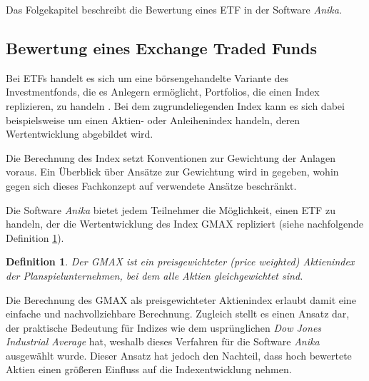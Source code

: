 \documentclass[12pt, a4paper]{article}
\theoremstyle{plain}
\newtheorem{definition}{Definition}
\begin{document}
 
Das Folgekapitel beschreibt die Bewertung eines \gls{ETF} in der Software \textit{Anika}.

\subsection{Bewertung eines Exchange Traded Funds}
\label{sec:bewertung_eines_exchange_traded_funds}

Bei \glspl{ETF} handelt es sich um eine börsengehandelte Variante des Investmentfonds, die es Anlegern ermöglicht, Portfolios, die einen Index replizieren, zu handeln \autocite[][S.~103]{bodie_investments_2018}. Bei dem zugrundeliegenden Index kann es sich dabei beispielsweise um einen Aktien- oder Anleihenindex handeln, deren Wertentwicklung abgebildet wird.

Die Berechnung des Index setzt Konventionen zur Gewichtung der Anlagen voraus. Ein Überblick über Ansätze zur Gewichtung wird in \textcite[][S.~44~ff.]{bodie_investments_2018} gegeben, wohin gegen sich dieses Fachkonzept auf verwendete Ansätze beschränkt.

Die Software \textit{Anika} bietet jedem Teilnehmer die Möglichkeit, einen ETF zu handeln, der die Wertentwicklung des Index \gls{GMAX} repliziert (siehe nachfolgende Definition \ref{def:gmax}).

\begin{definition}
	\label{def:gmax}
	Der \gls{GMAX} ist ein preisgewichteter (\textit{price weighted}) Aktienindex der Planspielunternehmen, bei dem alle Aktien gleichgewichtet sind.
\end{definition}

Die Berechnung des \gls{GMAX} als preisgewichteter Aktienindex erlaubt damit eine einfache und nachvollziehbare Berechnung. Zugleich stellt es einen Ansatz dar, der praktische Bedeutung für Indizes wie dem usprünglichen \textit{Dow Jones Industrial Average} hat, weshalb dieses Verfahren für die Software \textit{Anika} ausgewählt wurde. Dieser Ansatz hat jedoch den Nachteil, dass hoch bewertete Aktien einen größeren Einfluss auf die Indexentwicklung nehmen.
\end{document}
